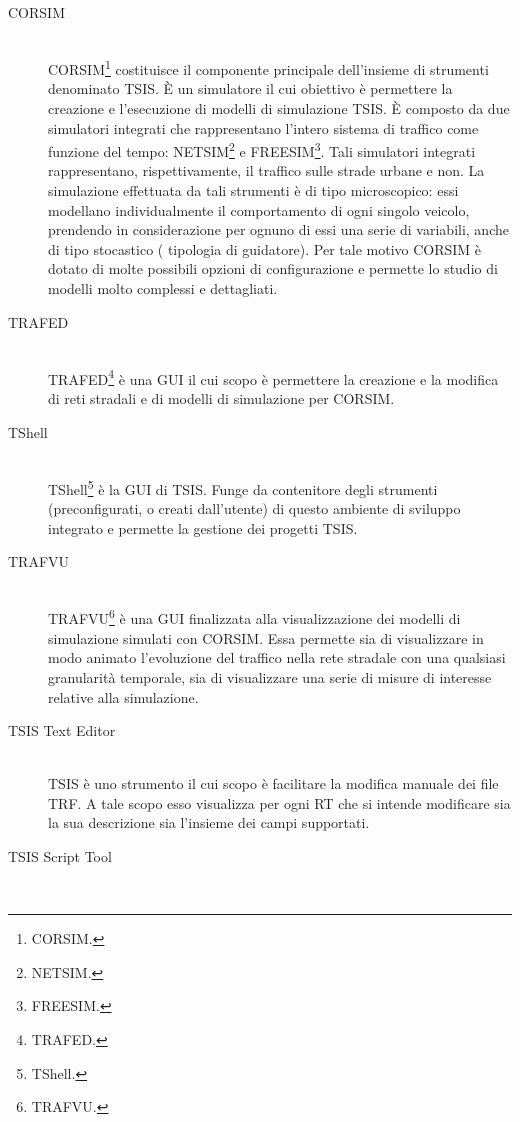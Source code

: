 \begin{description}
\item[CORSIM] \hfill \\
\acs{CORSIM}\footnote{\acf{CORSIM}.} costituisce il componente principale dell'insieme di strumenti denominato \acs{TSIS}. È un simulatore il cui obiettivo è permettere la creazione e l'esecuzione di modelli di simulazione \acs{TSIS}. È composto da due simulatori integrati che rappresentano l'intero sistema di traffico come funzione del tempo: \acs{NETSIM}\footnote{\acf{NETSIM}.} e \acs{FREESIM}\footnote{\acf{FREESIM}.}. Tali simulatori integrati rappresentano, rispettivamente, il traffico sulle strade urbane e non. La simulazione effettuata da tali strumenti è di tipo microscopico: essi modellano individualmente il comportamento di ogni singolo veicolo, prendendo in considerazione per ognuno di essi una serie di variabili, anche di tipo stocastico (\eg{} tipologia di guidatore). Per tale motivo \acs{CORSIM} è dotato di molte possibili opzioni di configurazione e permette lo studio di modelli molto complessi e dettagliati.
\item[TRAFED] \hfill \\
\acs{TRAFED}\footnote{\acf{TRAFED}.} è una \acs{GUI} il cui scopo è permettere la creazione e la modifica di reti stradali e di modelli di simulazione per \acs{CORSIM}.
\item[TShell] \hfill \\
\acs{TShell}\footnote{\acf{TShell}.} è la \acs{GUI} di \acs{TSIS}. Funge da contenitore degli strumenti (preconfigurati, o creati dall'utente) di questo ambiente di sviluppo integrato e permette la gestione dei progetti \acs{TSIS}.
\item[TRAFVU] \hfill \\
\acs{TRAFVU}\footnote{\acf{TRAFVU}.} è una \acs{GUI} finalizzata alla visualizzazione dei modelli di simulazione simulati con \acs{CORSIM}. Essa permette sia di visualizzare in modo animato l'evoluzione del traffico nella rete stradale con una qualsiasi granularità temporale, sia di visualizzare una serie di misure di interesse relative alla simulazione.
\item[TSIS Text Editor] \hfill \\
\acs{TSIS}  è uno strumento il cui scopo è facilitare la modifica manuale dei file \acs{TRF}. A tale scopo esso visualizza per ogni \acs{RT} che si intende modificare sia la sua descrizione sia l'insieme dei campi supportati.
\item[TSIS Script Tool] \hfill \\

\end{description}
